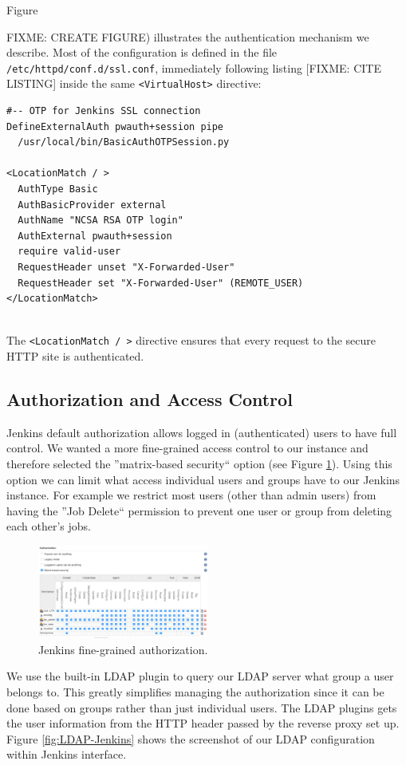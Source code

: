 \documentclass[10pt, conference, compsocconf]{IEEEtran}
\begin{document}
Figure {FIXME: CREATE FIGURE) illustrates the authentication mechanism we describe. 
Most of the configuration is defined in the file \texttt{/etc/httpd/conf.d/ssl.conf}, immediately following listing [FIXME: CITE LISTING] inside the same \texttt{<VirtualHost>} directive:

\begin{lstlisting}
#-- OTP for Jenkins SSL connection
DefineExternalAuth pwauth+session pipe 
  /usr/local/bin/BasicAuthOTPSession.py

<LocationMatch / > 
  AuthType Basic
  AuthBasicProvider external
  AuthName "NCSA RSA OTP login" 
  AuthExternal pwauth+session
  require valid-user  
  RequestHeader unset "X-Forwarded-User"
  RequestHeader set "X-Forwarded-User" (REMOTE_USER)
</LocationMatch>
 
\end{lstlisting}
The \texttt{<LocationMatch / >} directive ensures that every request to the secure HTTP site is authenticated. 

\subsection{Authorization and Access Control}
\label{subsec:authorization}

Jenkins default authorization allows logged in (authenticated) users to have full control. 
We wanted a more fine-grained access control to our instance and therefore selected the ''matrix-based security`` option (see Figure \ref{fig:jenkinsAuthorization}). Using this option we can limit what access individual users and groups have to our Jenkins instance. 
For example we restrict most users (other than admin users) from having the ''Job Delete`` permission to prevent one user or group from deleting each other's jobs. 

\begin{figure}[h]
\centering
\includegraphics[width=0.5\textwidth]{Configure-Global-Security}
\caption{Jenkins fine-grained authorization.}
\label{fig:jenkinsAuthorization}
\end{figure}

We use the built-in LDAP plugin to query our LDAP server what group a user belongs to.
This greatly simplifies managing the authorization since it can be done based on groups rather than just individual users. 
The LDAP plugins gets the user information from the HTTP header passed by the reverse proxy set up. 
Figure \ref{fig:LDAP-Jenkins} shows the screenshot of our LDAP configuration within Jenkins interface.

}
\end{document}
